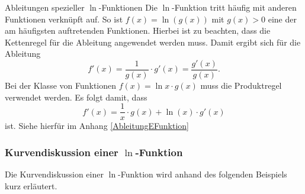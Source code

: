 \begin{satz}{Ableitungen spezieller $\ln$-Funktionen}{}
Die $\ln$-Funktion tritt häufig mit anderen Funktionen verknüpft auf. So ist $f(x) = \ln{(g(x))}$ mit $g(x)>0$ eine der am häufigsten auftretenden Funktionen. Hierbei ist zu beachten, dass die Kettenregel für die Ableitung angewendet werden muss. Damit ergibt sich für die Ableitung $$f'(x) = \dfrac{1}{ g(x)} \cdot g'(x) = \dfrac{g'(x)}{g(x)}.$$  
Bei der Klasse von Funktionen $f(x) = \ln{x} \cdot g(x)$ muss die Produktregel verwendet werden. Es folgt damit, dass
$$f'(x) = \dfrac{1}{x}\cdot g(x) +\ln{(x)} \cdot g'(x)$$ 
ist. Siehe hierfür im Anhang \ref{AbleitungEFunktion}
\end{satz}
 \subsubsection{Kurvendiskussion einer $\ln$-Funktion}
 Die Kurvendiskussion einer $\ln$-Funktion wird anhand des folgenden Beispiels kurz erläutert.
